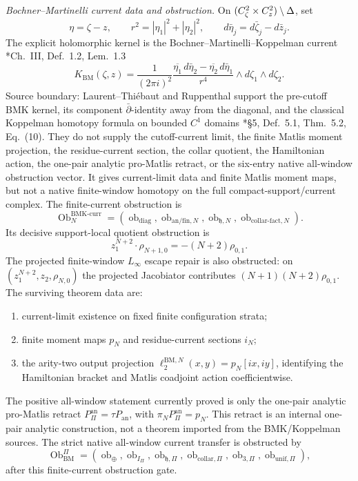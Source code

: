\begin{stmt}
  \emph{Bochner--Martinelli current data and obstruction.} On
  \((C^2_\zeta\times C^2_z)\setminus\Delta\), set
  \[
    \eta=\zeta-z,\qquad
    r^2=|\eta_1|^2+|\eta_2|^2,\qquad
    d\bar\eta_j=d\bar\zeta_j-d\bar z_j .
  \]
  The explicit holomorphic kernel is the Bochner--Martinelli--Koppelman
  current
  \cite{laurent-thiebaut-bmk}*{Ch.~III, Def.~1.2, Lem.~1.3}
  \[
    K_{\mathrm{BM}}(\zeta,z)
    =
    \frac{1}{(2\pi i)^2}
    \frac{
      \overline{\eta_1}\,d\bar\eta_2
      -
      \overline{\eta_2}\,d\bar\eta_1
    }{r^4}
    \wedge d\zeta_1\wedge d\zeta_2 .
  \]
  Source boundary: Laurent--Thi\'ebaut and Ruppenthal support the
  pre-cutoff BMK kernel, its component \(\bar\partial\)-identity away
  from the diagonal, and the classical Koppelman homotopy formula on
  bounded \(C^1\) domains
  \cite{ruppenthal-bmk}*{\S5, Def.~5.1, Thm.~5.2, Eq.~(10)}.  They do
  not supply the cutoff-current limit, the finite Matlis moment
  projection, the residue-current section, the collar quotient, the
  Hamiltonian action, the one-pair analytic pro-Matlis retract, or the
  six-entry native all-window obstruction vector.
  It gives current-limit data and finite Matlis moment maps, but not a
  native finite-window homotopy on the full compact-support/current
  complex.  The finite-current obstruction is
  \[
    \operatorname{Ob}^{\mathrm{BMK\mbox{-}curr}}_N
    =
    (\operatorname{ob}_{\mathrm{diag}},
     \operatorname{ob}_{\mathrm{an}/\mathrm{fin},N},
     \operatorname{ob}_{\mathfrak h,N},
     \operatorname{ob}_{\mathrm{collar\mbox{-}fact},N}).
  \]
  Its decisive support-local quotient obstruction is
  \[
    z_1^{N+2}\cdot\rho_{N+1,0}=-(N+2)\rho_{0,1}.
  \]
  The projected finite-window \(L_\infty\) escape repair is also
  obstructed: on \((z_1^{N+2},z_2,\rho_{N,0})\) the projected Jacobiator
  contributes \((N+1)(N+2)\rho_{0,1}\).  The surviving theorem data are:
  \begin{enumerate}[label=(\arabic*)]
    \item current-limit existence on fixed finite configuration strata;
    \item finite moment maps \(p_N\) and residue-current sections \(i_N\);
    \item the arity-two output projection
      \(\ell_2^{\mathrm{BM},N}(x,y)=p_N[ix,iy]\), identifying the
      Hamiltonian bracket and Matlis coadjoint action coefficientwise.
  \end{enumerate}
  The positive all-window statement currently proved is only the
  one-pair analytic pro-Matlis retract
  \(P_{\Pi}^{\mathrm{an}}=\tau P_{\mathrm{an}}\), with
  \(\pi_NP_{\Pi}^{\mathrm{an}}=p_N\).  This retract is an internal
  one-pair analytic construction, not a theorem imported from the
  BMK/Koppelman sources.  The strict native all-window current transfer
  is obstructed by
  \[
    \operatorname{Ob}^{\Pi}_{\mathrm{BM}}
    =
    (\operatorname{ob}_{\oplus},\operatorname{ob}_{I_\Pi},
     \operatorname{ob}_{\mathfrak h,\Pi},
     \operatorname{ob}_{\mathrm{collar},\Pi},
     \operatorname{ob}_{3,\Pi},
     \operatorname{ob}_{\mathrm{unif},\Pi}),
  \]
  after this finite-current obstruction gate.


\end{stmt}
